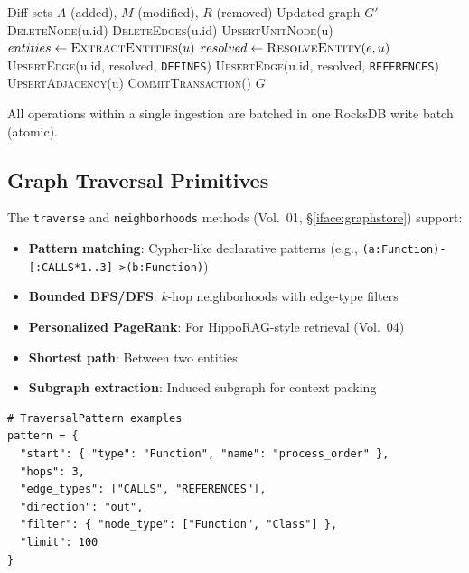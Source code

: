 \begin{algorithm}[H]
\caption{Incremental Graph Update}
\label{alg:graph-incremental}
\begin{algorithmic}[1]
\Require Diff sets $A$ (added), $M$ (modified), $R$ (removed)
\Ensure Updated graph $G'$
  \State \textsc{DeleteNode}(u.id) 
  \State \textsc{DeleteEdges}(u.id) 
\EndFor
{}
  \State \textsc{UpsertUnitNode}(u)
  \State $entities \gets \textsc{ExtractEntities}(u)$
    \State $resolved \gets \textsc{ResolveEntity}(e, u)$ 
      \State \textsc{UpsertEdge}(u.id, resolved, \texttt{DEFINES})
    \Else
      \State \textsc{UpsertEdge}(u.id, resolved, \texttt{REFERENCES})
    \EndIf
  \EndFor
  \State \textsc{UpsertAdjacency}(u) 
\EndFor
\State \textsc{CommitTransaction}()
\State \Return $G$
\end{algorithmic}
\end{algorithm}

All operations within a single ingestion are batched in one RocksDB write batch (atomic).

\subsection{Graph Traversal Primitives}
\label{sec:kg:traversal}

The \texttt{traverse} and \texttt{neighborhoods} methods (Vol.~01, \S\ref{iface:graphstore}) support:

\begin{itemize}
  \item \textbf{Pattern matching}: Cypher-like declarative patterns (e.g., \texttt{(a:Function)-[:CALLS*1..3]->(b:Function)})
  \item \textbf{Bounded BFS/DFS}: $k$-hop neighborhoods with edge-type filters
  \item \textbf{Personalized PageRank}: For HippoRAG-style retrieval (Vol.~04)
  \item \textbf{Shortest path}: Between two entities
  \item \textbf{Subgraph extraction}: Induced subgraph for context packing
\end{itemize}

\begin{verbatim}
# TraversalPattern examples
pattern = {
  "start": { "type": "Function", "name": "process_order" },
  "hops": 3,
  "edge_types": ["CALLS", "REFERENCES"],
  "direction": "out",
  "filter": { "node_type": ["Function", "Class"] },
  "limit": 100
}
\end{verbatim}

